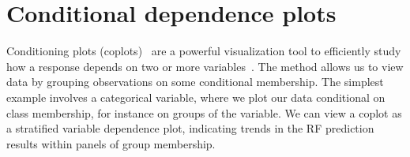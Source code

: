 \documentclass[article]{jss}
\begin{document}

\section{Conditional dependence plots}\label{S:coplots}

Conditioning plots (coplots)~\citep{chambers:1992,cleveland:1993}  are a powerful visualization tool to efficiently study how a response depends on two or more variables~\citep{cleveland:1993}. The method allows us to view data by grouping observations on some conditional membership. The simplest example involves a categorical variable, where we plot our data conditional on class membership, for instance on groups of the  variable. We can view a coplot as a stratified variable dependence plot, indicating trends in the RF prediction results within panels of group membership.
\end{document}
